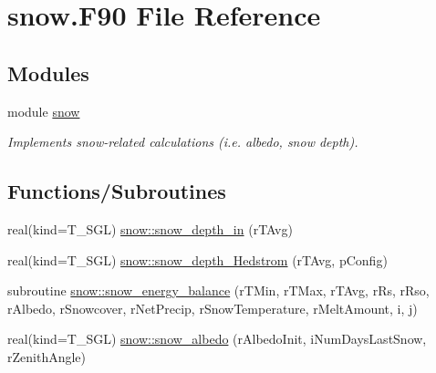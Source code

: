\hypertarget{snow_8_f90}{
\section{snow.F90 File Reference}
\label{snow_8_f90}
}
\subsection*{Modules}
\begin{DoxyCompactItemize}
\item 
module \hyperlink{namespacesnow}{snow}


\begin{DoxyCompactList}\small\item\em Implements snow-\/related calculations (i.e. albedo, snow depth). \item\end{DoxyCompactList}

\end{DoxyCompactItemize}
\subsection*{Functions/Subroutines}
\begin{DoxyCompactItemize}
\item 
real(kind=T\_\-SGL) \hyperlink{namespacesnow_aed84f456b1eba7f7f3a0e07f7b9c9a46}{snow::snow\_\-depth\_\-in} (rTAvg)
\item 
real(kind=T\_\-SGL) \hyperlink{namespacesnow_a7e8731b7ad525930f1c0d5018bb2785c}{snow::snow\_\-depth\_\-Hedstrom} (rTAvg, pConfig)
\item 
subroutine \hyperlink{namespacesnow_a82e94557e1c7361db292cd7bfb0045ac}{snow::snow\_\-energy\_\-balance} (rTMin, rTMax, rTAvg, rRs, rRso, rAlbedo, rSnowcover, rNetPrecip, rSnowTemperature, rMeltAmount, i, j)
\item 
real(kind=T\_\-SGL) \hyperlink{namespacesnow_a0d0e799c65a90426558cbbb74b28f8c5}{snow::snow\_\-albedo} (rAlbedoInit, iNumDaysLastSnow, rZenithAngle)
\end{DoxyCompactItemize}
